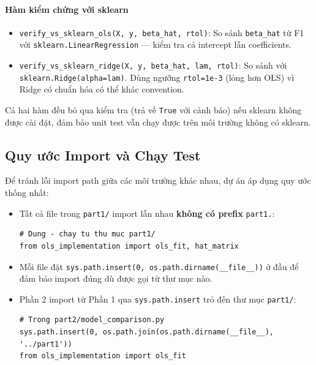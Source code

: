 \paragraph{Hàm kiểm chứng với sklearn}

\begin{itemize}
    \item \texttt{verify\_vs\_sklearn\_ols(X, y, beta\_hat, rtol)}: So sánh \texttt{beta\_hat} từ F1 với \texttt{sklearn.LinearRegression} --- kiểm tra cả intercept lẫn coefficients.
    \item \texttt{verify\_vs\_sklearn\_ridge(X, y, beta\_hat, lam, rtol)}: So sánh với \texttt{sklearn.Ridge(alpha=lam)}. Dùng ngưỡng \texttt{rtol=1e-3} (lỏng hơn OLS) vì Ridge có chuẩn hóa có thể khác convention.
\end{itemize}

Cả hai hàm đều bỏ qua kiểm tra (trả về \texttt{True} với cảnh báo) nếu sklearn không được cài đặt, đảm bảo unit test vẫn chạy được trên môi trường không có sklearn.

\subsection{Quy ước Import và Chạy Test}

Để tránh lỗi import path giữa các môi trường khác nhau, dự án áp dụng quy ước thống nhất:

\begin{tcolorbox}[mycodebox, colback=gray!5!white, colframe=gray!50!black,
    title={\textbf{Quy tắc import path toàn dự án}}]
\begin{itemize}
    \item Tất cả file trong \texttt{part1/} import lẫn nhau \textbf{không có prefix} \texttt{part1.}:
    \begin{verbatim}
# Dung - chay tu thu muc part1/
from ols_implementation import ols_fit, hat_matrix
    \end{verbatim}
    \item Mỗi file đặt \texttt{sys.path.insert(0, os.path.dirname(\_\_file\_\_))} ở đầu để đảm bảo import đúng dù được gọi từ thư mục nào.
    \item Phần 2 import từ Phần 1 qua \texttt{sys.path.insert} trỏ đến thư mục \texttt{part1/}:
    \begin{verbatim}
# Trong part2/model_comparison.py
sys.path.insert(0, os.path.join(os.path.dirname(__file__), '../part1'))
from ols_implementation import ols_fit
    \end{verbatim}
\end{itemize}
\end{tcolorbox}

